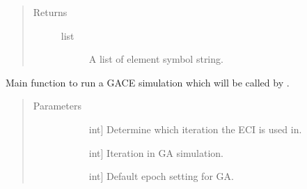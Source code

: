 \documentclass[letterpaper,10pt,english]{sphinxmanual}
\begin{document}
\begin{fulllineitems}
\begin{fulllineitems}
\begin{quote}
\begin{description}
\item[{Returns}] \leavevmode\begin{description}
\item[{list}] \leavevmode
\sphinxAtStartPar
A list of element symbol string.

\end{description}

\end{description}\end{quote}

\end{fulllineitems}


\begin{fulllineitems}
\label{\detokenize{pygace:pygace.general_gace.GeneralApp.run}}
\sphinxAtStartPar
Main function to run a GACE simulation which will be called by
.
\begin{quote}\begin{description}
\item[{Parameters}] \leavevmode\begin{description}
\item[{}] \leavevmode{[}int{]}
\sphinxAtStartPar
Determine which iteration the ECI is used in.

\item[{}] \leavevmode{[}int{]}
\sphinxAtStartPar
Iteration in GA simulation.

\item[{}] \leavevmode{[}int{]}
\sphinxAtStartPar
Default epoch setting for GA.


\end{description}
\end{description}
\end{quote}
\end{fulllineitems}
\end{fulllineitems}
\end{document}
